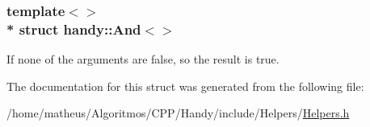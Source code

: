 \subsubsection*{template$<$$>$\\*
struct handy\+::\+And$<$$>$}

If none of the arguments are {\ttfamily false}, so the result is {\ttfamily true}. 

The documentation for this struct was generated from the following file\+:\begin{DoxyCompactItemize}
\item 
/home/matheus/\+Algoritmos/\+C\+P\+P/\+Handy/include/\+Helpers/\hyperlink{Helpers_2Helpers_8h}{Helpers.\+h}\end{DoxyCompactItemize}
